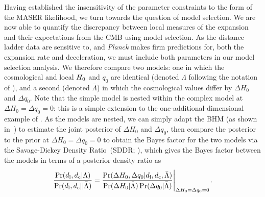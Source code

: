 \documentclass[a4paper,fleqn,usenatbib]{mnras}
\newcommand{\msame}{\Lambda}
\newcommand{\mdiff}{\bar{\Lambda}}
\newcommand{\datl}{d_{\rm l}}
\newcommand{\datc}{d_{\rm c}}
\newcommand{\decel}{\ensuremath{q_0}}
\newcommand{\dhubble}{\ensuremath{\Delta H_0}}
\newcommand{\ddecel}{\ensuremath{\Delta q_0}}
\begin{document}
{Having established the insensitivity of the parameter constraints to the form of the MASER likelihood, we turn towards the question of model selection.  We are now able to quantify the discrepancy between local measures of the expansion and their expectations from the CMB using model selection. As the distance ladder data are sensitive to, and {\it Planck} makes firm predictions for, both the expansion rate and deceleration, we must include both parameters in our model selection analysis. We therefore compare two models: one in which the cosmological and local $H_0$ and $\decel$ are identical (denoted $\msame$ following the notation of ), and a second (denoted $\mdiff$) in which the cosmological values differ by $\dhubble$ and $\ddecel$. Note that the simple model is nested within the complex model at $\dhubble = \ddecel = 0$: this is a simple extension to the one-additional-dimensional example of . As the models are nested, we can simply adapt the BHM (as shown in~) to estimate the joint posterior of $\dhubble$ and $\ddecel$, then compare the posterior to the prior at $\dhubble = \ddecel = 0$ to obtain the Bayes factor for the two models via the Savage-Dickey Density Ratio~(SDDR; \citealt{Dickey:1971}), which gives the Bayes factor between the models in terms of a posterior density ratio as
\begin{equation}
\left. \frac{ \prob(\datl , \datc | \msame) }{ \prob(\datl , \datc |  | \mdiff) } = \frac{ \prob(\dhubble , \ddecel | \datl , \datc , \mdiff) }{ \prob(\dhubble |\mdiff) \, \prob(\ddecel | \mdiff) } \right|_{\dhubble = \ddecel = 0}.
\end{equation}

}
\end{document}
